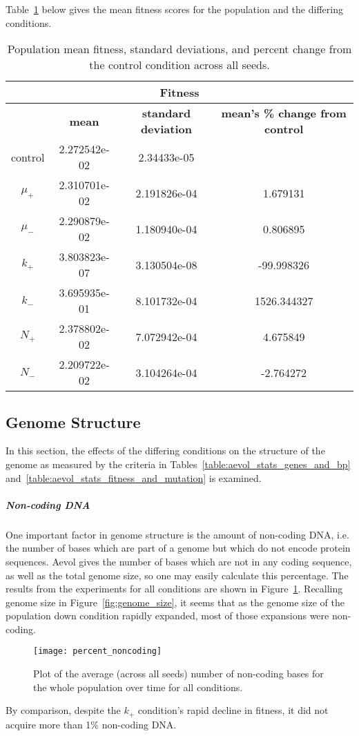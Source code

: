 Table~\ref{table:fitness_means_std_dev} below gives the mean fitness scores for the population and the differing conditions. 
\begin{table}[H]
	\centering
	\begin{tabular}{|c||c|c|c|}
		\hline
		\multicolumn{4}{c}{\Large \textbf{Fitness}} \\
		\hline
		& \textbf{mean} & \textbf{standard deviation} & \textbf{mean's \% change from control} \\
		\hline \hline
		control & 2.272542e-02 & 2.34433e-05 & \textemdash \\ 
		\hline
		$\mu_+$ & 2.310701e-02 & 2.191826e-04 & 1.679131 \\ 
		\hline
		$\mu_-$ & 2.290879e-02 & 1.180940e-04 & 0.806895 \\ 
		\hline
		$k_+$ & 3.803823e-07 & 3.130504e-08 & -99.998326 \\ 
		\hline
		$k_-$ & 3.695935e-01 & 8.101732e-04 & 1526.344327 \\ 
		\hline
		$N_+$ & 2.378802e-02 & 7.072942e-04 & 4.675849 \\ 
		\hline
		$N_-$ & 2.209722e-02 & 3.104264e-04 & -2.764272 \\ 
		\hline
	\end{tabular}
	\caption[Fitness means and standard deviations.]{Population mean fitness, standard deviations, and percent change from the control condition across all seeds. }
	\label{table:fitness_means_std_dev}
\end{table}

\subsection{Genome Structure}
In this section, the effects of the differing conditions on the structure of the genome as measured by the criteria in Tables~\ref{table:aevol_stats_genes_and_bp} and~\ref{table:aevol_stats_fitness_and_mutation} is examined. 

\subparagraph{Non-coding DNA}
One important factor in genome structure is the amount of non-coding DNA, i.e. the number of bases which are part of a genome but which do not encode protein sequences. Aevol gives the number of bases which are not in any coding sequence, as well as the total genome size, so one may easily calculate this percentage. The results from the experiments for all conditions are shown in Figure~\ref{fig:mean_non-coding_DNA}. Recalling genome size in Figure~\ref{fig:genome_size}, it seems that as the genome size of the population down condition rapidly expanded, most of those expansions were non-coding.
\begin{figure}[H]
	\centering
	\texttt{[image: percent\_noncoding]}
	\caption[Non-coding DNA]{Plot of the average (across all seeds) number of non-coding bases for the whole population over time for all conditions.}
	\label{fig:mean_non-coding_DNA}
\end{figure}
By comparison, despite the $k_+$ condition's rapid decline in fitness, it did not acquire more than 1\% non-coding DNA. 

